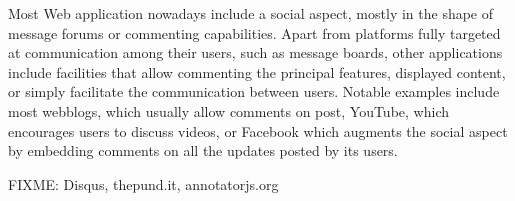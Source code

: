 
Most Web application nowadays include a social aspect, mostly in the shape of
message forums or commenting capabilities. Apart from platforms fully
targeted at communication among their users, such as message boards, other
applications include facilities that allow commenting the principal features,
displayed content, or simply facilitate the communication between users.
Notable examples include most webblogs, which usually allow comments on post,
YouTube, which encourages users to discuss videos, or Facebook which augments
the social aspect by embedding comments on all the updates posted by its users.

FIXME: Disqus, thepund.it, annotatorjs.org
